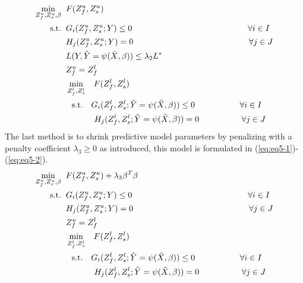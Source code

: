 \documentclass[12pt]{article}
\begin{document}
\begin{subequations}
\begin{flalign}
\min\limits_{{Z_f^u,Z_s^u,\beta}} \hspace{2 mm} & F(Z_f^u,Z_s^u) \label{eq:eq4-1}\\
\textrm{s.t.} \hspace{2 mm} & G_i(Z_f^u,Z_s^u;Y)\leq 0 \hspace{49 mm} \forall i \in I\\
& H_j(Z_f^u,Z_s^u;Y)=0 \hspace{49 mm} \forall j \in J\\
& L(Y,\hat{Y}=\psi(\Tilde{X},\beta)) \leq \lambda_2L^*\\
& Z_f^u=Z_f^l\\
&\min\limits_{Z_f^l,Z_s^l}  \hspace{3 mm} F(Z_f^l,Z_s^l)\\
&\hspace{2.5 mm} \textrm{s.t.} \hspace{3.5 mm} G_i(Z_f^l,Z_s^l;\hat{Y}=\psi(\Tilde{X},\beta))\leq 0 \hspace{19 mm} \forall i \in I\\
&\hspace{12 mm} H_j(Z_f^l,Z_s^l;\hat{Y}=\psi(\Tilde{X},\beta))= 0 \hspace{18 mm} \forall j \in J \label{eq:eq4-2}
\end{flalign}
\end{subequations}
The last method is to shrink predictive model parameters by penalizing with a penalty coefficient $\lambda_3 \geq 0$ as \cite{Tibshirani94regressionshrinkage} introduced, this model is formulated in (\ref{eq:eq5-1})-(\ref{eq:eq5-2}).\\
\begin{subequations}
\begin{flalign}
\min\limits_{{Z_f^u,Z_s^u,\beta}} \hspace{2 mm} & F(Z_f^u,Z_s^u)+\lambda_3 \beta^T \beta \label{eq:eq5-1}\\
\textrm{s.t.} \hspace{2 mm} & G_i(Z_f^u,Z_s^u;Y)\leq 0 \hspace{49 mm} \forall i \in I\\
& H_j(Z_f^u,Z_s^u;Y)=0 \hspace{49 mm} \forall j \in J\\
& Z_f^u=Z_f^l\\
&\min\limits_{Z_f^l,Z_s^l}  \hspace{3 mm} F(Z_f^l,Z_s^l)\\
&\hspace{2.5 mm} \textrm{s.t.} \hspace{3.5 mm} G_i(Z_f^l,Z_s^l;\hat{Y}=\psi(\Tilde{X},\beta))\leq 0 \hspace{19 mm} \forall i \in I\\
&\hspace{12 mm} H_j(Z_f^l,Z_s^l;\hat{Y}=\psi(\Tilde{X},\beta))= 0 \hspace{18 mm} \forall j \in J \label{eq:eq5-2}
\end{flalign}
\end{subequations}
\end{document}

